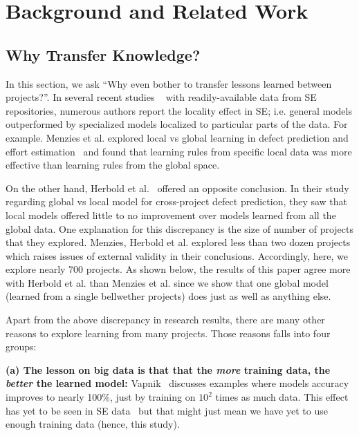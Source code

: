 \documentclass[10pt,journal,compsoc]{IEEEtran}
\begin{document}


\section{Background and Related Work}
\label{sec:literature}
\subsection{Why Transfer Knowledge?}
\label{sec:related}

In this section, we ask ``Why even bother to transfer lessons learned between projects?''. In several recent studies ~\cite{bettenburg2012think, menzies2012local, posnett2011ecological} with readily-available data from SE repositories, numerous authors report the locality effect in SE; i.e. general models outperformed by specialized models localized to particular parts of the data.
For example.
Menzies et al. explored local vs global learning in defect prediction and effort estimation~\cite{menzies2012local}  and found that
 learning rules from specific local data was more
 effective than learning rules from the global space.
 
 
On the other hand,
Herbold et al.~\cite{herbold2017global}  offered an opposite conclusion.
In their   study regarding global vs local model for cross-project defect prediction,
they saw that  local models offered little to no improvement over models learned
from all the global data.
One explanation for this discrepancy  is the size of number of projects that they explored.
Menzies, Herbold et al. explored less than two dozen projects which raises issues of external validity in their conclusions. Accordingly, here,  we explore nearly 700 projects. As shown below, the results of this paper agree  more with Herbold et al. than  Menzies et al. since we show that one global model (learned from a single bellwether projects) does just as well as anything else.

Apart from the above discrepancy in research results, there are many other reasons to
explore learning from many projects. Those reasons   falls into four groups:

\textbf{(a) The lesson on big data is that that the {\em more} training data, the {\em better} the learned model:} Vapnik~\cite{vapnik14} discusses examples where models accuracy improves to nearly 100\%, just by training on $10^2$ times as much data. This effect has yet to be seen in SE data~\cite{menzies2013guest} but that might just mean we have yet to use enough training data (hence, this study). 
\end{document}
